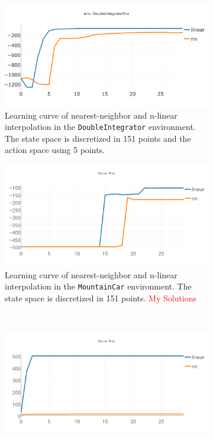 \documentclass{article}
\begin{document}
\begin{enumerate}[(a)]
\begin{figure}[h!]
    \centering
    \begin{subfigure}{0.45\textwidth}
        \centering
        \includegraphics[width=\textwidth]{figures/part_2_c_a.png}
        \caption{Learning curve of  nearest-neighbor and n-linear interpolation in the \texttt{DoubleIntegrator} environment. 
                 The state space is discretized in 151 points and the action space using 5 points.}
    \end{subfigure}
    \hspace{0.2in}
    \begin{subfigure}{0.45\textwidth}
        \centering
        \includegraphics[width=\textwidth]{figures/part_2_c_b.png}
         \caption{Learning curve of  nearest-neighbor and n-linear interpolation in the \texttt{MountainCar} environment. 
                 The state space is discretized in 151 points. \textcolor{red}{My Solutions}}
    \end{subfigure}
\\
    \centering
    \begin{subfigure}{0.45\textwidth}
        \centering
        \includegraphics[width=\textwidth]{figures/part_2_c_c.png}

\end{subfigure}
\end{figure}
\end{enumerate}
\end{document}
